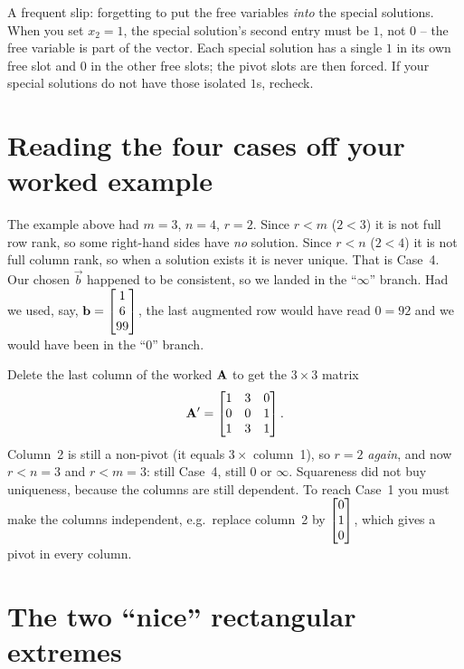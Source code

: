 \begin{trapbox}
A frequent slip: forgetting to put the free variables \emph{into} the special solutions.
When you set $x_2=1$, the special solution's second entry must be $1$, not $0$ -- the free
variable is part of the vector. Each special solution has a single $1$ in its own free slot
and $0$ in the other free slots; the pivot slots are then forced. If your special solutions
do not have those isolated $1$s, recheck.
\end{trapbox}

\section{Reading the four cases off your worked example}

The example above had $m=3$, $n=4$, $r=2$. Since $r<m$ ($2<3$) it is not full row rank, so
some right-hand sides have \emph{no} solution. Since $r<n$ ($2<4$) it is not full column
rank, so when a solution exists it is never unique. That is Case~4. Our chosen $\vec{b}$
happened to be consistent, so we landed in the ``$\infty$'' branch. Had we used, say,
$\mathbf{b}=\begin{bmatrix}1\\6\\99\end{bmatrix}$, the last augmented row would have read $0=92$ and we would
have been in the ``$0$'' branch.

\begin{example}
\label{ch13:flip}
Delete the last column of the worked $\mathbf{A}$ to get the $3\times3$ matrix
\[
  \mathbf{A}'=\begin{bmatrix}1&3&0\\0&0&1\\1&3&1\end{bmatrix}.
\]
Column~2 is still a non-pivot
(it equals $3\times$ column~1), so $r=2$ \emph{again}, and now $r<n=3$ and $r<m=3$: still
Case~4, still $0$ or $\infty$. Squareness did not buy uniqueness, because the columns are
still dependent. To reach Case~1 you must make the columns independent, e.g.\ replace
column~2 by $\begin{bmatrix}0\\1\\0\end{bmatrix}$, which gives a pivot in every column.
\end{example}

\section{The two ``nice'' rectangular extremes}

